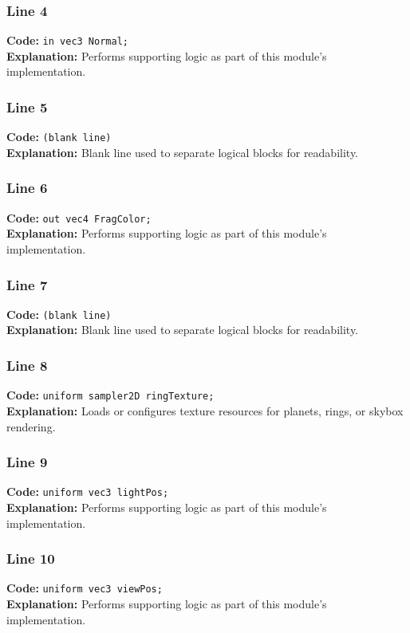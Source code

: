 \documentclass[11pt,a4paper]{article}
\begin{document}
\subsubsection*{Line 4}
\textbf{Code:} \verb|in vec3 Normal;|\\
\textbf{Explanation:} Performs supporting logic as part of this module's implementation.

\subsubsection*{Line 5}
\textbf{Code:} \texttt{(blank line)}\\
\textbf{Explanation:} Blank line used to separate logical blocks for readability.

\subsubsection*{Line 6}
\textbf{Code:} \verb|out vec4 FragColor;|\\
\textbf{Explanation:} Performs supporting logic as part of this module's implementation.

\subsubsection*{Line 7}
\textbf{Code:} \texttt{(blank line)}\\
\textbf{Explanation:} Blank line used to separate logical blocks for readability.

\subsubsection*{Line 8}
\textbf{Code:} \verb|uniform sampler2D ringTexture;|\\
\textbf{Explanation:} Loads or configures texture resources for planets, rings, or skybox rendering.

\subsubsection*{Line 9}
\textbf{Code:} \verb|uniform vec3 lightPos;|\\
\textbf{Explanation:} Performs supporting logic as part of this module's implementation.

\subsubsection*{Line 10}
\textbf{Code:} \verb|uniform vec3 viewPos;|\\
\textbf{Explanation:} Performs supporting logic as part of this module's implementation.
\end{document}
